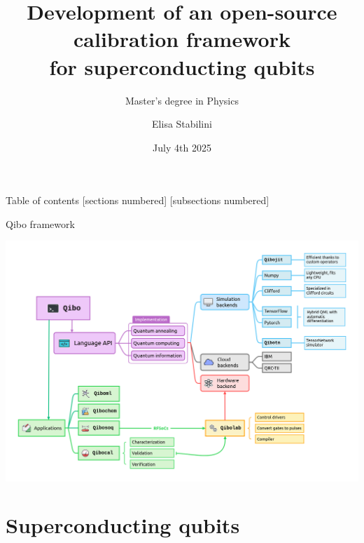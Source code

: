 \documentclass[aspectratio=169,10pt]{beamer}
\title{Development of an open-source calibration framework\\ for superconducting qubits}
\subtitle{Master's degree in Physics}
\author{Elisa Stabilini}
\institute{Università degli Studi di Milano - Department of Physics}
\date{July 4th 2025}
\begin{document}
\maketitle

\begin{frame}{Table of contents}
    [sections numbered]
    [subsections numbered]  
    \tableofcontents[hideallsubsections]
\end{frame}

\begin{frame}[t,fragile]{Qibo framework}
  \begin{center}
      \includegraphics[height=0.80\paperheight]{figures/qibo_ecosystem.png}
  \end{center}
\end{frame}



\section{Superconducting qubits}
\end{document}
